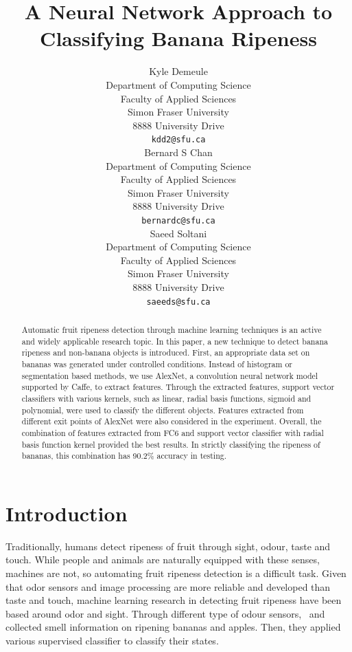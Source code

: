 \documentclass{article} %
\title{A Neural Network Approach to Classifying Banana Ripeness}
\author{
Kyle Demeule\\
Department of Computing Science\\
Faculty of Applied Sciences\\
Simon Fraser University\\
8888 University Drive\\
\texttt{kdd2@sfu.ca} \\
\And
Bernard S Chan \\
Department of Computing Science\\
Faculty of Applied Sciences\\
Simon Fraser University\\
8888 University Drive\\
\texttt{bernardc@sfu.ca} \\
\AND
Saeed Soltani\\
Department of Computing Science\\Faculty of Applied Sciences\\
Simon Fraser University\\
8888 University Drive\\
\texttt{saeeds@sfu.ca} \\
}
\begin{document}
\maketitle

\begin{abstract}
Automatic fruit ripeness detection through machine learning techniques is an active and widely applicable research topic. In this paper, a new technique to detect banana ripeness and non-banana objects is introduced. First, an appropriate data set on bananas was generated under controlled conditions. Instead of histogram or segmentation based methods, we use AlexNet, a convolution neural network model supported by Caffe, to extract features. Through the extracted features, support vector classifiers with various kernels, such as linear, radial basis functions, sigmoid and polynomial,  were used to classify the different objects. Features extracted from different exit points of AlexNet were also considered in the experiment. Overall, the combination of features extracted from FC6 and support vector classifier with radial basis function kernel provided the best results. In strictly classifying the ripeness of bananas, this combination has 90.2\% accuracy in testing. \end{abstract}

\section{Introduction}

Traditionally, humans detect ripeness of fruit  through sight, odour, taste and touch. While people and animals are naturally equipped with these senses, machines are not, so automating fruit ripeness detection is a difficult task. Given that odor sensors and image processing are more reliable and developed than taste and touch, machine learning research in detecting fruit ripeness have been based around odor and sight.  Through different type of odour sensors,~\citet{llobet1999non} and~\citet{li2007neural} collected smell information on ripening bananas and apples. Then, they applied various supervised classifier to classify their states.
\end{document}
